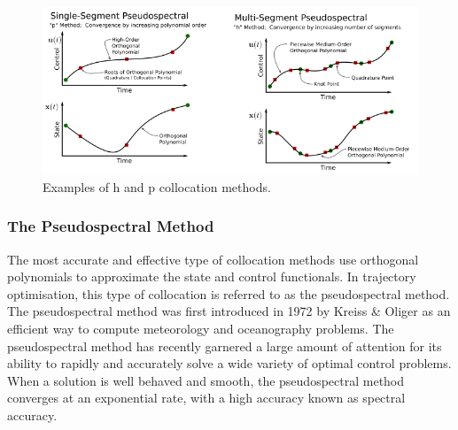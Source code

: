 \begin{figure}[ht]
	\centering
	\includegraphics[width=0.9\linewidth]{figures/2_literature-review/HPExamples}
	\caption{Examples of \textsf{h} and \textsf{p} collocation methods\cite{Kelly2015}.}
	\label{fig:HPExamples}
\end{figure}

\subsubsection{The Pseudospectral Method}\label{sec:PS}


The most accurate and effective type of collocation methods use orthogonal polynomials to approximate the state and control functionals\cite{Fahroo2000}. In trajectory optimisation, this type of collocation is referred to as the pseudospectral method\cite{Kelly2015}. 
The pseudospectral method was first introduced in 1972 by Kreiss \& Oliger\cite{Kreiss1972} as an efficient way to compute meteorology and oceanography problems. The pseudospectral method has recently garnered a large amount of attention for its ability to rapidly and accurately solve a wide variety of optimal control problems.  When a solution is well behaved and smooth, the pseudospectral method converges at an exponential rate, with a high accuracy known as spectral accuracy\cite{Ross2004,Darby2011a}. 

